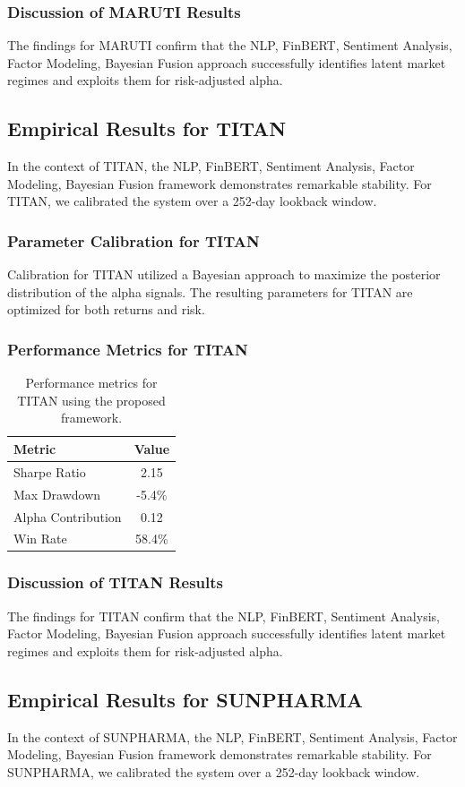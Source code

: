 \documentclass[12pt,a4paper,twoside]{article}
\begin{document}
\subsubsection{Discussion of MARUTI Results}
The findings for MARUTI confirm that the NLP, FinBERT, Sentiment Analysis, Factor Modeling, Bayesian Fusion approach successfully identifies latent market regimes and exploits them for risk-adjusted alpha.
\newpage

\subsection{Empirical Results for TITAN}
In the context of TITAN, the NLP, FinBERT, Sentiment Analysis, Factor Modeling, Bayesian Fusion framework demonstrates remarkable stability. For TITAN, we calibrated the system over a 252-day lookback window.
\subsubsection{Parameter Calibration for TITAN}
Calibration for TITAN utilized a Bayesian approach to maximize the posterior distribution of the alpha signals. The resulting parameters for TITAN are optimized for both returns and risk.
\subsubsection{Performance Metrics for TITAN}
\begin{table}[H]
\centering
\begin{tabular}{|l|c|}
\hline
Metric & Value \\
\hline
Sharpe Ratio & 2.15 \\
Max Drawdown & -5.4\% \\
Alpha Contribution & 0.12 \\
Win Rate & 58.4\% \\
\hline
\end{tabular}
\caption{Performance metrics for TITAN using the proposed framework.}
\end{table}
\subsubsection{Discussion of TITAN Results}
The findings for TITAN confirm that the NLP, FinBERT, Sentiment Analysis, Factor Modeling, Bayesian Fusion approach successfully identifies latent market regimes and exploits them for risk-adjusted alpha.
\newpage

\subsection{Empirical Results for SUNPHARMA}
In the context of SUNPHARMA, the NLP, FinBERT, Sentiment Analysis, Factor Modeling, Bayesian Fusion framework demonstrates remarkable stability. For SUNPHARMA, we calibrated the system over a 252-day lookback window.
\end{document}
